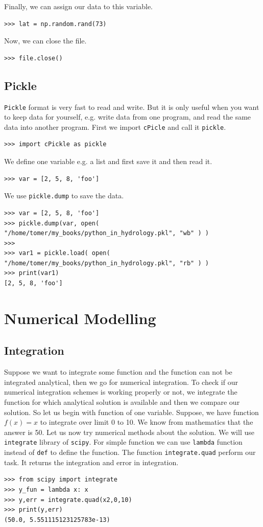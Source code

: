 \documentclass[10pt]{book}
\begin{document}
Finally, we can assign our data to this variable. 
\beforeverb \begin{verbatim}
>>> lat = np.random.rand(73)
\end{verbatim} \afterverb
Now, we can close the file.
\beforeverb \begin{verbatim}
>>> file.close()
\end{verbatim} \afterverb

\section{Pickle}
\verb"Pickle" format is very fast to read and write. But it is only useful when you want to keep data for yourself, e.g. write data from one program, and read the same data into another program. First we import \verb"cPicle" and call it \verb"pickle". 
\beforeverb \begin{verbatim}
>>> import cPickle as pickle
\end{verbatim} \afterverb

We define one variable e.g. a list and first save it and then read it.
\beforeverb \begin{verbatim}
>>> var = [2, 5, 8, 'foo']
\end{verbatim} \afterverb

We use \verb"pickle.dump" to save the data. 
\beforeverb \begin{verbatim}
>>> var = [2, 5, 8, 'foo']
>>> pickle.dump(var, open( "/home/tomer/my_books/python_in_hydrology.pkl", "wb" ) )
>>> 
>>> var1 = pickle.load( open( "/home/tomer/my_books/python_in_hydrology.pkl", "rb" ) )
>>> print(var1)
[2, 5, 8, 'foo']
\end{verbatim} \afterverb

\chapter{Numerical Modelling}

\section{Integration}
Suppose we want to integrate some function and the function can not be integrated analytical, then we go for numerical integration. To check if our numerical integration schemes is working properly or not, we integrate the function for which analytical solution is available and then we compare our solution. So let us begin with function of one variable. Suppose, we have function $f(x) = x$ to integrate over limit 0 to 10. We know from mathematics that the answer is 50. Let us now try numerical methods about the solution. We will use \verb"integrate" library of \verb"scipy". For simple function we can use \verb"lambda" function instead of \verb"def" to define the function. The function \verb"integrate.quad" perform our task. It returns the integration and error in integration.
\beforeverb \begin{verbatim}
>>> from scipy import integrate
>>> y_fun = lambda x: x
>>> y,err = integrate.quad(x2,0,10)
>>> print(y,err)
(50.0, 5.551115123125783e-13)
\end{verbatim} \afterverb
\end{document}
